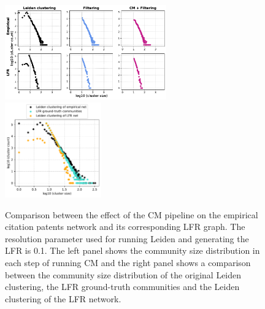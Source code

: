 \documentclass[a4paper]{article}   	%
\begin{document}
\begin{figure}[h!]
\centering
\includegraphics[width=0.62\textwidth]{figs/cit_patents_cm_steps_lfr1.pdf}
\includegraphics[width=0.37\textwidth]{figs/cit_patents_1_cm_size.pdf}
\caption[CM pipeline on the empirical citation patents network and its model LFR graph for r=0.1]{Comparison between the effect of the CM pipeline on the empirical citation patents network and its corresponding LFR graph. The resolution parameter used for running Leiden and generating the LFR is 0.1. The left panel shows the community size distribution in each step of running CM and the right panel shows a comparison between the community size distribution of the original Leiden clustering, the LFR ground-truth communities and the Leiden clustering of the LFR network.}
\label{fig:2cliques}
\end{figure}
\end{document}
